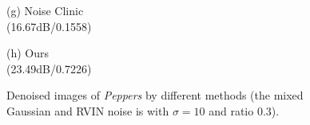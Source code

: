 \documentclass[runningheads]{llncs}
\begin{document}
\begin{figure}
{\begin{minipage}[t]{0.244\textwidth}
{\footnotesize (g) Noise Clinic \\(16.67dB/0.1558)}
\end{minipage}
\begin{minipage}[t]{0.244\textwidth}
\centering
{}
{\footnotesize (h) Ours \\(23.49dB/0.7226)}
\end{minipage}
}
\caption{Denoised images of \textsl{Peppers} by different methods (the mixed Gaussian and RVIN noise is with $\sigma = 10$ and ratio $0.3$).}
\label{fig12}
\end{figure}
\end{document}
